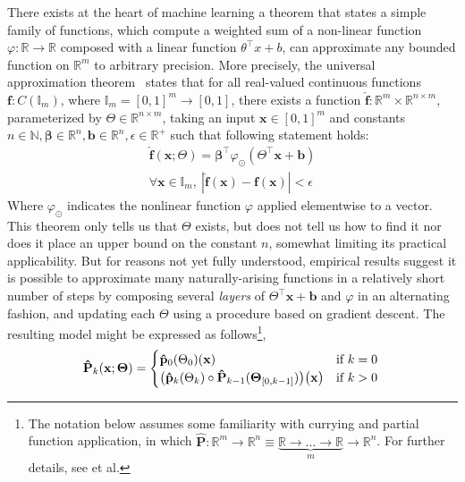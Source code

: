 \documentclass[12pt,initial,twoside,maitrise]{dms}
\numberwithin{equation}{section}
\numberwithin{table}{chapter}
\numberwithin{figure}{chapter}
\begin{document}
There exists at the heart of machine learning a theorem that states a simple family of functions, which compute a weighted sum of a non-linear function $\varphi: \mathbb{R} \rightarrow \mathbb{R}$ composed with a linear function $\theta^\intercal x + b$, can approximate any bounded function on $\mathbb{R}^m$ to arbitrary precision. More precisely, the universal approximation theorem~\citep{hornik1989multilayer} states that for all real-valued continuous functions $\mathbf{f}: C(\mathbb{I}_m)$, where $\mathbb{I}_m = [0, 1]^m \rightarrow [0, 1]$, there exists a function $\mathbf{\hat f}: \mathbb{R}^m \times \mathbb{R}^{n \times m}$, parameterized by $\Theta \in \mathbb{R}^{n \times m}$, taking an input $\mathbf x \in [0, 1]^m$ and constants $n \in \mathbb{N}, \mathbf{\beta} \in \mathbb{R}^n, \mathbf{b} \in \mathbb{R}^n, \epsilon \in \mathbb{R}^+$ such that following statement holds:
%
\begin{equation}
    \begin{split}
        \mathbf{\hat{f}}(\mathbf{x}; \Theta) = \mathbf{\beta}^\intercal \varphi_{\odot} \left(\Theta^\intercal \mathbf{x} + \mathbf{b}\right) \\
        \forall \mathbf{x} \in \mathbb{I}_m, \ | \mathbf{\hat f}( \mathbf{x} ) - \mathbf{f} ( \mathbf{x} ) | < \epsilon
    \end{split}
\end{equation}
%
Where $\varphi_{\odot}$ indicates the nonlinear function $\varphi$ applied elementwise to a vector. This theorem only tells us that $\Theta$ exists, but does not tell us how to find it nor does it place an upper bound on the constant $n$, somewhat limiting its practical applicability. But for reasons not yet fully understood, empirical results suggest it is possible to approximate many naturally-arising functions in a relatively short number of steps by composing several \textit{layers} of $\Theta^\intercal \mathbf{x} + \mathbf{b}$ and $\varphi$ in an alternating fashion, and updating each $\Theta$ using a procedure based on gradient descent. The resulting model might be expressed as follows\footnote{The notation below assumes some familiarity with currying and partial function application, in which $\mathbf{\hat P}: \mathbb{R}^m \rightarrow \mathbb{R}^n \equiv \underbrace{\mathbb R \rightarrow \ldots \rightarrow \mathbb R}_{m}\rightarrow \mathbb{R}^n$. For further details, see \citet{schonfinkel1924bausteine, curry1958combinatory} et al.},
%
\begin{equation} \label{eq:recursive_parametric_eq}
    \mathbf{\hat P}_k(\mathbf{x}; \mathbf{\Theta}) = \begin{cases} \mathbf{\hat p}_0(\Theta_0)(\mathbf{x}) &\text{if } k=0\\ \big(\mathbf{\hat p}_k(\Theta_k)\circ \mathbf{\hat P}_{k-1}(\mathbf{\Theta}_{[0, k-1]})\big)\big(\mathbf{x}\big)&\text{if } k > 0 \end{cases} \\
\end{equation}
\end{document}
